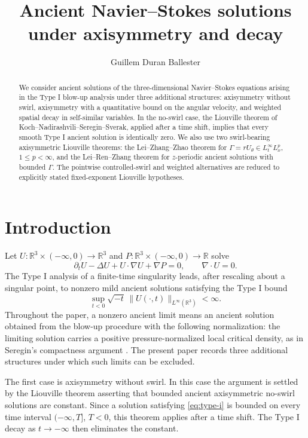 \documentclass[11pt]{amsart}
\title[Ancient Navier--Stokes solutions under axisymmetry and decay]{Ancient Navier--Stokes solutions under axisymmetry and decay}
\author{Guillem Duran Ballester}
\date{}
\theoremstyle{plain}
\theoremstyle{definition}
\theoremstyle{remark}
\numberwithin{equation}{section}
\begin{document}
\begin{abstract}
We consider ancient solutions of the three-dimensional Navier--Stokes equations
arising in the Type I blow-up analysis under three additional structures:
axisymmetry without swirl, axisymmetry with a quantitative bound on the angular
velocity, and weighted spatial decay in self-similar variables.  In the no-swirl
case, the Liouville theorem of Koch--Nadirashvili--Seregin--Sverak, applied
after a time shift, implies that every smooth Type I ancient solution is
identically zero.  We also use two swirl-bearing axisymmetric Liouville
theorems: the Lei--Zhang--Zhao theorem for
\(\Gamma=rU_\theta\in L_t^\infty L_x^p\), \(1\le p<\infty\), and the
Lei--Ren--Zhang theorem for \(z\)-periodic ancient solutions with bounded
\(\Gamma\).  The pointwise controlled-swirl and weighted alternatives are
reduced to explicitly stated fixed-exponent Liouville hypotheses.
\end{abstract}

\maketitle

\section{Introduction}

Let \(U:\mathbb R^{3}\times(-\infty,0)\to\mathbb R^{3}\) and
\(P:\mathbb R^{3}\times(-\infty,0)\to\mathbb R\) solve
\begin{equation}\label{eq:ns}
\partial_t U-\Delta U+U\cdot\nabla U+\nabla P=0,\qquad
\nabla\cdot U=0.
\end{equation}
The Type I analysis of a finite-time singularity leads, after rescaling about a
singular point, to nonzero mild ancient solutions satisfying the Type I bound
\cite{Seregin2012,SereginSverak2009}
\begin{equation}\label{eq:type-i}
\sup_{t<0}\sqrt{-t}\,\|U(\cdot,t)\|_{L^\infty(\mathbb R^3)}<\infty .
\end{equation}
Throughout the paper, a nonzero ancient limit means an ancient solution
obtained from the blow-up procedure with the following normalization: the
limiting solution carries a positive
pressure-normalized local critical density, as in Seregin's compactness
argument \cite{Seregin2012}.  The present paper
records three additional structures under which such limits can be excluded.

The first case is axisymmetry without swirl.  In this case the argument is
settled by the Liouville theorem asserting that bounded ancient axisymmetric
no-swirl solutions are constant.  Since a solution satisfying \eqref{eq:type-i}
is bounded on every time interval \((-\infty,T]\), \(T<0\), this theorem
applies after a time shift.  The Type I decay as \(t\to-\infty\) then
eliminates the constant.
\end{document}
